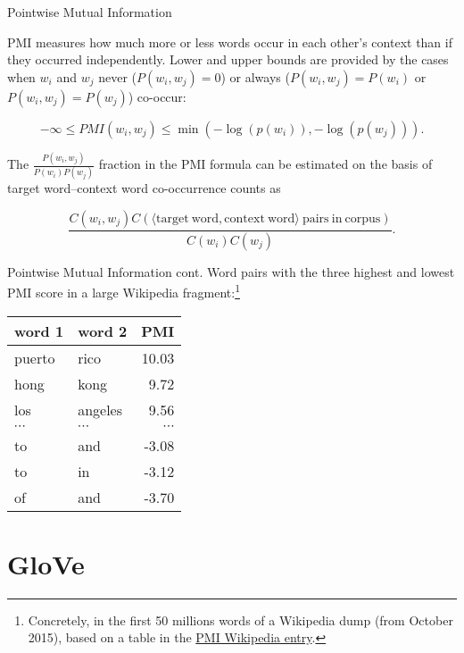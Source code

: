\documentclass[style=upen, size=14pt]{powerdot}
\theoremstyle{definition}
\begin{document}
\begin{slide}[toc=PMI]{Pointwise Mutual Information}

  PMI measures how much more or less words occur in each other's context than
  if they occurred independently. Lower and upper bounds are provided by the
  cases when $w_i$ and $w_j$ never ($P(w_i, w_j) = 0$) or always
  ($P(w_i, w_j) = P(w_i)$ or $P(w_i, w_j) = P(w_j)$) co-occur:
\begin{small}
  $$-\infty \leq PMI(w_i, w_j) \leq \min(-\log(p(w_i)), -\log(p(w_j))).$$
\end{small}
The $\frac{P(w_i, w_j)}{P(w_i)P(w_j)}$ fraction in the PMI formula can be
estimated on the basis of target word--context word co-occurrence counts as
\begin{small}
  $$\frac{C(w_i, w_j)C(\mathrm{\langle target~word, context~word\rangle~pairs~in~corpus})}{C(w_i)C(w_j)}.$$
\end{small}

\end{slide}

\begin{slide}[toc=]{Pointwise Mutual Information cont.}
  Word pairs with the three highest and lowest PMI score in a large Wikipedia
  fragment:\footnote{Concretely, in the first 50 millions words of a Wikipedia
    dump (from October 2015), based on a table in the
    \href{https://en.wikipedia.org/wiki/Pointwise_mutual_information}{PMI
      Wikipedia entry}.}
  \begin{center}
  \begin{small}
      \begin{tabular}{llr}
      \hline
      word 1 & word 2 & PMI \\
      \hline
      puerto & rico & 10.03\\
      hong & kong & 9.72\\
      los & angeles & 9.56\\
      $\cdots$ & $\cdots$ & $\cdots$\\
        to & and & -3.08 \\
      to & in & -3.12\\
      of & and & -3.70\\
    \end{tabular}
  \end{small}
    \end{center}
\end{slide}

\section{GloVe}
\end{document}
